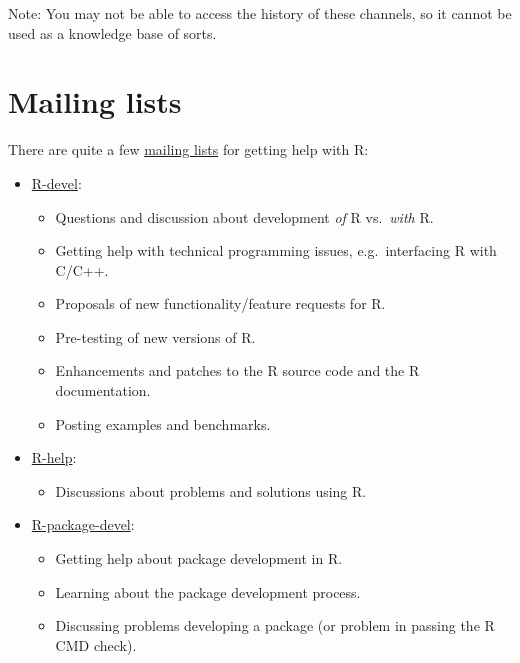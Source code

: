 \documentclass[
]{book}
\providecommand{\tightlist}{%
  \setlength{\itemsep}{0pt}\setlength{\parskip}{0pt}}
\begin{document}
Note: You may not be able to access the history of these channels, so it cannot be used as a knowledge base of sorts.

\section{Mailing lists}\label{mailing-lists}

There are quite a few \href{https://www.r-project.org/mail.html}{mailing lists} for getting help with R:

\begin{itemize}
\tightlist
\item
  \href{https://stat.ethz.ch/mailman/listinfo/r-devel}{R-devel}:

  \begin{itemize}
  \tightlist
  \item
    Questions and discussion about development \emph{of} R vs.~\emph{with} R.
  \item
    Getting help with technical programming issues, e.g.~interfacing R with C/C++.
  \item
    Proposals of new functionality/feature requests for R.
  \item
    Pre-testing of new versions of R.
  \item
    Enhancements and patches to the R source code and the R documentation.
  \item
    Posting examples and benchmarks.
  \end{itemize}
\item
  \href{https://stat.ethz.ch/mailman/listinfo/r-help}{R-help}:

  \begin{itemize}
  \tightlist
  \item
    Discussions about problems and solutions using R.
  \end{itemize}
\item
  \href{https://stat.ethz.ch/mailman/listinfo/r-package-devel}{R-package-devel}:

  \begin{itemize}
  \tightlist
  \item
    Getting help about package development in R.
  \item
    Learning about the package development process.
  \item
    Discussing problems developing a package (or problem in passing the R CMD check).
  \end{itemize}
\end{itemize}
\end{document}
